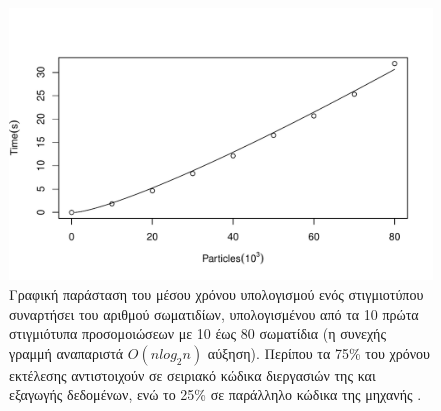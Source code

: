 \begin{figure}[h!]
  \centering
  \includegraphics[width=\textwidth]{figures/performance.pdf}
  \caption[Απόδοση προγράμματος προσομοίωσης] {Γραφική παράσταση του μέσου χρόνου
    υπολογισμού ενός στιγμιοτύπου  συναρτήσει του αριθμού σωματιδίων,
    υπολογισμένου από τα 10 πρώτα στιγμιότυπα προσομοιώσεων με 10 έως 80
    σωματίδια (η συνεχής γραμμή αναπαριστά $Ο(n log_2n)$ αύ\-ξη\-ση). Περίπου τα 75\% του
    χρόνου εκτέλεσης αντιστοιχούν σε σειριακό κώδικα διεργασιών της  και
    εξαγωγής δεδομένων, ενώ το 25\% σε παράλληλο κώδικα της μηχανής .}
  \label{fig:performance}
\end{figure}

